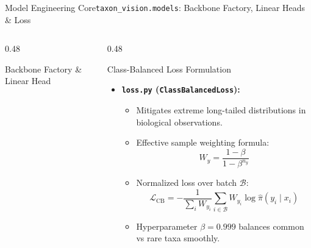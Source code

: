 \begin{frame}{Model Engineering Core}{\texttt{taxon\_vision.models}: Backbone Factory, Linear Heads \& Loss}
\begin{columns}[T]
\begin{column}{0.48\textwidth}
\begin{block}{Backbone Factory \& Linear Head}
            \end{block}
        \end{column}
        \begin{column}{0.48\textwidth}
            \begin{block}{Class-Balanced Loss Formulation}
                \begin{itemize}\scriptsize
                    \item \textbf{\texttt{loss.py} (\texttt{ClassBalancedLoss}):}
                        \begin{itemize}\tiny
                            \item Mitigates extreme long-tailed distributions in biological observations.
                            \item Effective sample weighting formula:
                                $$W_y = \frac{1 - \beta}{1 - \beta^{n_y}}$$
                            \item Normalized loss over batch $\mathcal{B}$:
                                $$\mathcal{L}_{\text{CB}} = - \frac{1}{\sum_{i} W_{y_i}} \sum_{i \in \mathcal{B}} W_{y_i} \log \hat{\pi}(y_i \mid x_i)$$
                            \item Hyperparameter $\beta = 0.999$ balances common vs rare taxa smoothly.
                        \end{itemize}
                \end{itemize}
            \end{block}
        \end{column}
    \end{columns}


\end{frame}

